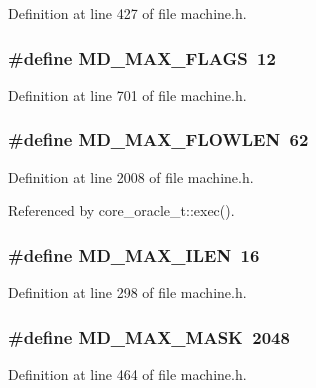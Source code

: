 Definition at line 427 of file machine.h.
\subsubsection[{MD\_\-MAX\_\-FLAGS}]{\setlength{\rightskip}{0pt plus 5cm}\#define MD\_\-MAX\_\-FLAGS~12}\label{machine_8h_d84e82bd7dd16beb396eb1ff781d1194}




Definition at line 701 of file machine.h.
\subsubsection[{MD\_\-MAX\_\-FLOWLEN}]{\setlength{\rightskip}{0pt plus 5cm}\#define MD\_\-MAX\_\-FLOWLEN~62}\label{machine_8h_b5025b1f354449f9b67d69c6c7271a48}




Definition at line 2008 of file machine.h.

Referenced by core\_\-oracle\_\-t::exec().
\subsubsection[{MD\_\-MAX\_\-ILEN}]{\setlength{\rightskip}{0pt plus 5cm}\#define MD\_\-MAX\_\-ILEN~16}\label{machine_8h_f694f367b2d512550e2a4e8e9a658937}




Definition at line 298 of file machine.h.
\subsubsection[{MD\_\-MAX\_\-MASK}]{\setlength{\rightskip}{0pt plus 5cm}\#define MD\_\-MAX\_\-MASK~2048}\label{machine_8h_e290a35f1ce1f4b6ff135cadc759f883}




Definition at line 464 of file machine.h.
